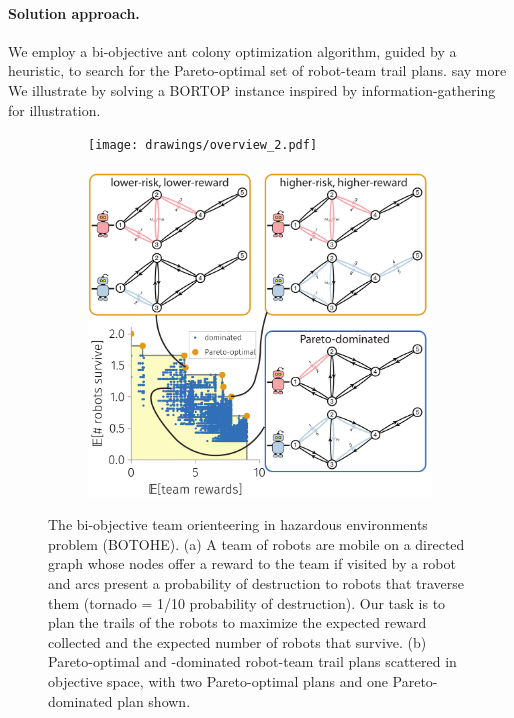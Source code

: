 \documentclass[11pt, oneside]{article}
\begin{document}
\paragraph{Solution approach.} 
We employ a bi-objective ant colony optimization algorithm, guided by a heuristic, to search for the Pareto-optimal set of robot-team trail plans.
{\color{red} say more}
We illustrate by solving a BORTOP instance inspired by information-gathering for illustration.

\begin{figure}[h!]
    \centering
     \begin{subfigure}[b]{0.62\textwidth}
    	\texttt{[image: drawings/overview\_2.pdf]}
	\caption{} \label{fig:overview}
    \end{subfigure}
    \begin{subfigure}[b]{0.66\textwidth}
    	\includegraphics[width=\textwidth]{drawings/toy_pareto_front2.pdf}
	\caption{} \label{fig:pareto_optimal}
    \end{subfigure}
    \caption{
      The bi-objective team orienteering in hazardous environments problem (BOTOHE).
      (a) A team of robots are mobile on a directed graph whose 
      nodes offer a reward to the team if visited by a robot and 
      arcs present a probability of destruction to robots that traverse them (tornado = 1/10 probability of destruction). Our task is to plan the trails of the robots to maximize the expected reward collected and the expected number of robots that survive.
      (b) Pareto-optimal and -dominated robot-team trail plans scattered in objective space, with two Pareto-optimal plans and one Pareto-dominated plan shown.}
\end{figure}
\end{document}
